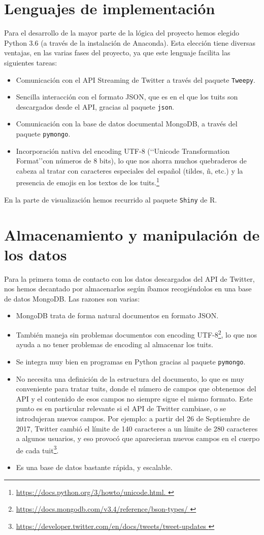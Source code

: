 \section{Lenguajes de implementación}

Para el desarrollo de la mayor parte de la lógica del proyecto hemos elegido Python 3.6 (a través de la
instalación de Anaconda). Esta elección tiene diversas ventajas, en las varias fases del proyecto, ya
que este lenguaje facilita las siguientes tareas:
\begin{itemize}
\item Comunicación con el API Streaming de Twitter a través del paquete {\tt Tweepy}.
\item Sencilla interacción con el formato JSON, que es en el que los tuits son descargados desde el API, gracias al paquete {\tt json}.
\item  Comunicación con la base de datos documental MongoDB, a través del paquete {\tt pymongo}.
\item Incorporación nativa del encoding UTF-8 (\lq\lq Unicode Transformation Format\rq\rq con números de 8 bits), 
lo que nos ahorra muchos quebraderos de cabeza al tratar con caracteres especiales del español (tildes, ñ, etc.)
y la presencia de emojis en los textos de los tuits.\footnote{\url{https://docs.python.org/3/howto/unicode.html. }}
\end{itemize}

En la parte de visualización hemos recurrido al paquete {\tt Shiny} de R.

\section{Almacenamiento y manipulación de los datos}
Para la primera toma de contacto con los datos descargados del API de Twitter, nos hemos decantado por almacenarlos según íbamos recogiéndolos en una base de datos MongoDB. Las razones son varias:
\begin{itemize}
\item MongoDB trata de forma natural documentos en formato JSON.
\item También maneja sin problemas documentos con encoding UTF-8\footnote{
\url{https://docs.mongodb.com/v3.4/reference/bson-types/ }}, lo que nos ayuda a no tener problemas de encoding al
almacenar los tuits.
\item Se integra muy bien en programas en Python gracias al paquete {\tt pymongo}.
\item No necesita una definición de la estructura del documento, lo que es muy conveniente
para tratar tuits, donde el número de campos que obtenemos del API y el contenido de esos campos no siempre
sigue el mismo formato. Este punto es en particular relevante si el API de Twitter cambiase, o se introdujeran nuevos 
campos. Por ejemplo: a partir del 26 de Septiembre de 2017,  Twitter cambió el límite de 140 caracteres
a un límite de 280 caracteres a algunos usuarios, y eso provocó que aparecieran nuevos campos en el cuerpo de cada
tuit\footnote{\url{https://developer.twitter.com/en/docs/tweets/tweet-updates }}.
\item Es una base de datos bastante rápida, y escalable.
\end{itemize}

